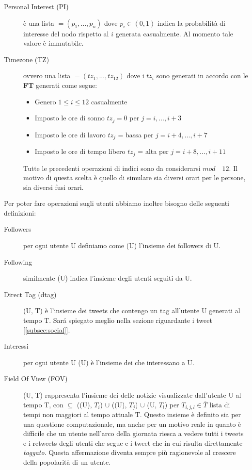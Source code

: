 \begin{description}
  \item[Personal Interest (PI)] \`e una lista \PI{} 
    $=(p_1, \dots, p_n)$ dove $p_i \in (0, 1)$ 
    indica la probabilit\`a di interesse del nodo rispetto al 
    \topic{} $i$ generata casualmente. Al momento tale valore \`e immutabile.
  \item[Timezone (TZ)] ovvero una lista \TZ{} $=(tz_1, \dots, tz_{12}) $
  dove i $tz_i$ sono generati in accordo con le \textbf{FT} generati 
  come segue:
  \begin{itemize}
    \item Genero $1\leq i \leq 12$ casualmente
    \item Imposto le ore di sonno $tz_j = 0$ per $j = i, \dots , i+3$
    \item Imposto le ore di lavoro $tz_j$ = bassa \activity{} per 
      $j = i+4, \dots , i+7$
    \item Imposto le ore di tempo libero $tz_j$ = alta \activity{}
      per $j = i+8, \dots , i+11$
  \end{itemize}
  Tutte le precedenti operazioni di indici sono da considerarsi 
  $mod \quad 12$. Il motivo di questa scelta \`e quello di simulare
  sia diversi orari per le persone, sia diversi fusi orari.
\end{description}

Per poter fare operazioni sugli utenti abbiamo inoltre bisogno delle 
seguenti definizioni:

\begin{description}
  \item[Followers] per ogni utente U definiamo come \followers{}(U) 
  l'insieme dei followers di U.
  \item[Following] similmente \following{}(U) indica
  l'insieme degli utenti seguiti da U.
  \item[Direct Tag (dtag)] \dtag{}(U, T) \`e l'insieme dei tweets che
  contengo un tag all'utente U generati al tempo T. 
  Sar\'a spiegato meglio nella sezione
  riguardante i tweet [\ref{subsec:social}].
  \item[Interessi] per ogni utente U \interest{}(U) \`e l'insieme
  dei \topic{} che interessano a U.
  \item[Field Of View (FOV)] \FOV{}(U, T) rappresenta l'insieme dei
  delle notizie visualizzate dall'utente U al tempo T, con 
  \FOV{} $\subseteq$ \twt{}(\following{}(U), $T_i$) $\cup$ 
  \retwt{}(\following{}(U), $T_j$) $\cup$ \dtag{}(U, $T_l$) 
  per $T_{i,j,l} \in \overline{T}$ lista di
  tempi non maggiori al tempo attuale T.
  Questo insieme \`e definito sia per una questione
  computazionale, ma anche per un motivo reale in quanto \`e 
  difficile che un utente nell'arco della giornata riesca a vedere
  tutti i tweets e i retweets degli utenti che segue e i tweet che
  in cui risulta direttamente \textit{taggato}. Questa affermazione
  diventa sempre pi\`u ragionevole al crescere della popolarit\`a 
  di un utente.
  
\end{description}

